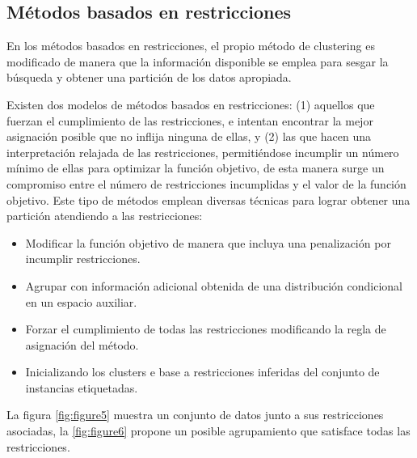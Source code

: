 \subsection{Métodos basados en restricciones}

En los métodos basados en restricciones, el propio método de clustering es modificado de manera que la información disponible se emplea para sesgar la búsqueda y obtener una partición de los datos apropiada.

Existen dos modelos de métodos basados en restricciones: (1) aquellos que fuerzan el cumplimiento de las restricciones, e intentan encontrar la mejor asignación posible que no inflija ninguna de ellas, y (2) las que hacen una interpretación relajada de las restricciones, permitiéndose incumplir un número mínimo de ellas para optimizar la función objetivo, de esta manera surge un compromiso entre el número de restricciones incumplidas y el valor de la función objetivo. Este tipo de métodos emplean diversas técnicas para lograr obtener una partición atendiendo a las restricciones:

\begin{itemize}
	
	\item Modificar la función objetivo de manera que incluya una penalización por incumplir restricciones.
	
	\item Agrupar con información adicional obtenida de una distribución condicional en un espacio auxiliar.
	
	\item Forzar el cumplimiento de todas las restricciones modificando la regla de asignación del método.
	
	\item Inicializando los clusters e base a restricciones inferidas del conjunto de instancias etiquetadas.
	
\end{itemize}

La figura \ref{fig:figure5} muestra un conjunto de datos junto a sus restricciones asociadas, la \ref{fig:figure6} propone un posible agrupamiento que satisface todas las restricciones.

